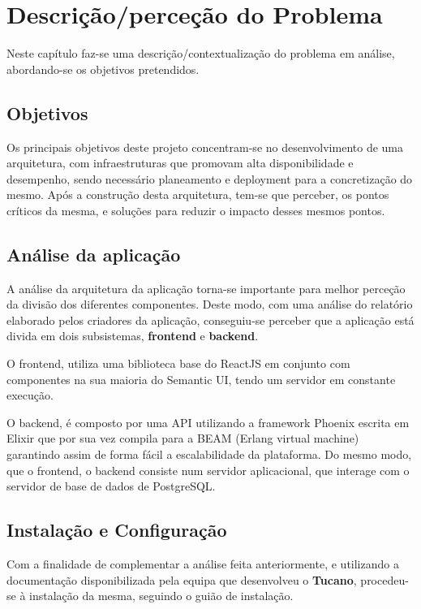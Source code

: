 \chapter{Descrição/perceção do Problema}

\hspace{5mm} Neste capítulo faz-se uma descrição/contextualização do problema em análise, abordando-se os objetivos pretendidos.

\section{Objetivos}
\hspace{5mm} Os principais objetivos deste projeto concentram-se no desenvolvimento de uma arquitetura, com infraestruturas que promovam alta disponibilidade e desempenho, sendo necessário planeamento e deployment para a concretização do mesmo. Após a construção desta arquitetura, tem-se que perceber, os pontos críticos da mesma, e soluções para reduzir o impacto desses mesmos pontos.

\section{Análise da aplicação}

\hspace{5mm} A análise da arquitetura da aplicação torna-se importante para melhor perceção da divisão dos diferentes componentes. Deste modo, com uma análise do relatório elaborado pelos criadores da aplicação, conseguiu-se perceber que a aplicação está divida em dois subsistemas, \textbf{frontend} e \textbf{backend}.

\hspace{5mm} O frontend, utiliza uma biblioteca base do ReactJS em conjunto com componentes na sua maioria do Semantic UI, tendo um servidor em constante execução.

\hspace{5mm} O backend, é composto por uma API utilizando a framework Phoenix escrita em Elixir que por sua vez compila para a BEAM (Erlang virtual machine) garantindo assim de forma fácil a escalabilidade da plataforma. Do mesmo modo, que o frontend, o backend consiste num servidor aplicacional, que interage com o servidor de base de dados de PostgreSQL.

\section{Instalação e Configuração}
\hspace{5mm} Com a finalidade de complementar a análise feita anteriormente, e utilizando a documentação disponibilizada pela equipa que desenvolveu o \textbf{Tucano}, procedeu-se à instalação da mesma, seguindo o guião de instalação.

